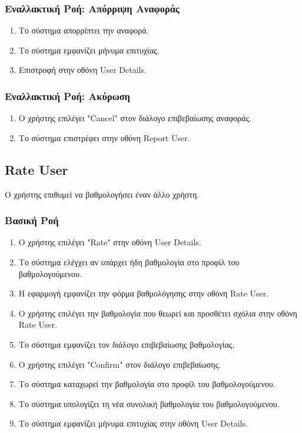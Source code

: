 \subsubsection{Εναλλακτική Ροή: Απόρριψη Αναφοράς}

\begin{enumerate}
    \item Το σύστημα απορρίπτει την αναφορά.
    \item Το σύστημα εμφανίζει μήνυμα επιτυχίας.
    \item Επιστροφή στην οθόνη User Details.
\end{enumerate}

\subsubsection{Εναλλακτική Ροή: Ακύρωση}

\begin{enumerate}
    \item Ο χρήστης επιλέγει "Cancel" στον διάλογο επιβεβαίωσης αναφοράς.
    \item Το σύστημα επιστρέφει στην οθόνη Report User.
\end{enumerate}


\subsection{Rate User}

Ο χρήστης επιθυμεί να βαθμολογήσει έναν άλλο χρήστη.

\subsubsection{Βασική Ροή}

\begin{enumerate}
    \item Ο χρήστης επιλέγει "Rate" στην οθόνη User Details.
    \item Το σύστημα ελέγχει αν υπάρχει ήδη βαθμολογία στο προφίλ του βαθμολογούμενου.
    \item Η εφαρμογή εμφανίζει την φόρμα βαθμολόγησης στην οθόνη Rate User.
    \item Ο χρήστης επιλέγει την βαθμολογία που θεωρεί και προσθέτει σχόλια στην οθόνη Rate User.
    \item Το σύστημα εμφανίζει τον διάλογο επιβεβαίωσης βαθμολογίας.
    \item Ο χρήστης επιλέγει "Confirm" στον διάλογο επιβεβαίωσης.
    \item Το σύστημα καταχωρεί την βαθμολογία στο προφίλ του βαθμολογούμενου.
    \item Το σύστημα υπολογίζει τη νέα συνολική βαθμολογία του βαθμολογούμενου.
    \item Το σύστημα εμφανίζει μήνυμα επιτυχίας στην οθόνη User Details.
\end{enumerate}

